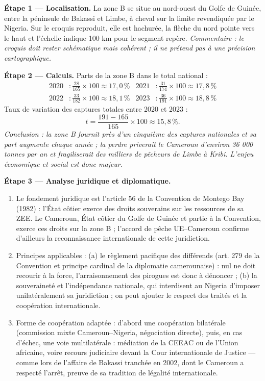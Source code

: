 \documentclass[11pt]{article}
\newcommand{\cle}[1]{{\popxbold\color{popdark}#1}}
\begin{document}
\begin{exoresolu}
\textbf{Étape 1 — Localisation.} La zone B se situe au nord-ouest du Golfe de Guinée, entre la péninsule de Bakassi et Limbe, à cheval sur la limite revendiquée par le Nigeria. Sur le croquis reproduit, elle est hachurée, la flèche du nord pointe vers le haut et l'échelle indique 100 km pour le segment repère. \emph{Commentaire : le croquis doit rester schématique mais cohérent ; il ne prétend pas à une précision cartographique.}

\tcblower

\textbf{Étape 2 — Calculs.} Parts de la zone B dans le total national :
\begin{align*}
2020 &: \frac{28}{165}\times 100 \approx 17{,}0\,\% &
2021 &: \frac{31}{174}\times 100 \approx 17{,}8\,\% \\
2022 &: \frac{33}{182}\times 100 \approx 18{,}1\,\% &
2023 &: \frac{36}{191}\times 100 \approx 18{,}8\,\%
\end{align*}
Taux de variation des captures totales entre 2020 et 2023 :
\[ t = \frac{191 - 165}{165} \times 100 \approx 15{,}8\,\%. \]
\emph{Conclusion : la zone B fournit près d'un cinquième des captures nationales et sa part augmente chaque année ; la perdre priverait le Cameroun d'environ 36 000 tonnes par an et fragiliserait des milliers de pêcheurs de Limbe à Kribi. L'enjeu économique et social est donc majeur.}

\textbf{Étape 3 — Analyse juridique et diplomatique.}
\begin{enumerate}
\item Le fondement juridique est l'article 56 de la Convention de Montego Bay (1982) : l'État côtier exerce des droits souverains sur les ressources de sa ZEE. Le Cameroun, État côtier du Golfe de Guinée et partie à la Convention, exerce ces droits sur la zone B ; l'accord de pêche UE--Cameroun confirme d'ailleurs la reconnaissance internationale de cette juridiction.
\item Principes applicables : (a) le \cle{règlement pacifique des différends} (art. 279 de la Convention et principe cardinal de la diplomatie camerounaise) : nul ne doit recourir à la force, l'arraisonnement des pirogues est donc à dénoncer ; (b) la \cle{souveraineté et l'indépendance nationale}, qui interdisent au Nigeria d'imposer unilatéralement sa juridiction ; on peut ajouter le \cle{respect des traités} et la \cle{coopération internationale}.
\item Forme de coopération adaptée : d'abord une \cle{coopération bilatérale} (commission mixte Cameroun--Nigeria, négociation directe), puis, en cas d'échec, une voie \cle{multilatérale} : médiation de la CEEAC ou de l'Union africaine, voire recours judiciaire devant la Cour internationale de Justice — comme lors de l'affaire de Bakassi tranchée en 2002, dont le Cameroun a respecté l'arrêt, preuve de sa tradition de légalité internationale.
\end{enumerate}


\end{exoresolu}
\end{document}
